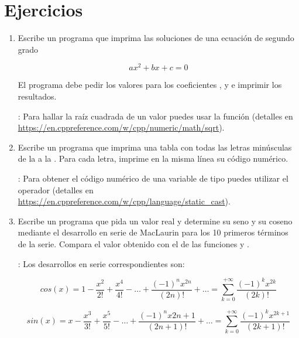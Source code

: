 \section{Ejercicios}

\begin{enumerate}

\item Escribe un programa que imprima las soluciones de una ecuación de segundo grado

\[
a x^2 + b x + c = 0
\]

El programa debe pedir los valores para los coeficientes ,  y
 e imprimir los resultados.

: Para hallar la raíz cuadrada de un valor puedes usar la función
 (detalles en 
\url{https://en.cppreference.com/w/cpp/numeric/math/sqrt}).

\item Escribe un programa que imprima una tabla con todas las letras minúsculas
      de la  a la . Para cada letra, imprime en la misma
      línea su código numérico.

: Para obtener el código numérico de una variable de tipo 
         puedes utilizar el operador 
         (detalles en \url{https://en.cppreference.com/w/cpp/language/static_cast}).

\item Escribe un programa que pida un valor real  y determine su seno y su
      coseno mediante el desarrollo en serie de MacLaurin para los 10 primeros términos
      de la serie. Compara el valor obtenido con el de las funciones  
      y .

: Los desarrollos en serie correspondientes son:

\[
cos(x) = 1 - \frac{x^2}{2!} + \frac{x^4}{4!} - \ldots + \frac{(-1)^n x^{2n}}{(2n)!} + \ldots
=
\sum_{k=0}^{+\infty} \frac{(-1)^k x^{2k}}{(2k)!}
\]

\[
sin(x) = x - \frac{x^3}{3!} + \frac{x^5}{5!} - \ldots + \frac{(-1)^n x{2n+1}}{(2n+1)!} + \ldots
=
\sum_{k=0}^{+\infty} \frac{(-1)^k x^{2k+1}}{(2k+1)!}
\]

\end{enumerate}
